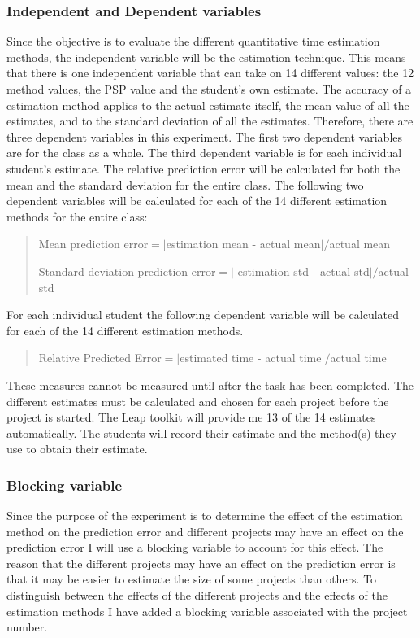 \subsubsection{Independent and Dependent variables}

Since the objective is to evaluate the different quantitative time estimation
methods, the independent variable will be the estimation technique.  This means
that there is one independent variable that can take on 14 different values:
the 12 method values, the PSP value and the student's own estimate.  The
accuracy of a estimation method applies to the actual estimate itself, the mean
value of all the estimates, and to the standard deviation of all the estimates.
Therefore, there are three dependent variables in this experiment.  The first
two dependent variables are for the class as a whole.  The third dependent
variable is for each individual student's estimate.  The relative prediction
error will be calculated for both the mean and the standard deviation for the
entire class.  The following two dependent variables will be calculated for
each of the 14 different estimation methods for the entire class:
\begin{quote}
Mean prediction error$ = | $estimation mean - actual mean$ | / $actual mean

Standard deviation prediction error$ = |$ estimation std - actual std$ | / $actual
std
\end{quote}

For each individual student the following dependent variable will be calculated
for each of the 14 different estimation methods.

\begin{quote}
Relative Predicted Error$ = | $estimated time - actual time$ | / $actual time
\end{quote}

These measures cannot be measured until after the task has been completed.  The
different estimates must be calculated and chosen for each project before the
project is started.  The Leap toolkit will provide me 13 of the 14 estimates
automatically. The students will record their estimate and the method(s) they use
to obtain their estimate.

\subsubsection{Blocking variable}

Since the purpose of the experiment is to determine the effect of the
estimation method on the prediction error and different projects may have an
effect on the prediction error I will use a blocking variable to account for
this effect.  The reason that the different projects may have an effect on the
prediction error is that it may be easier to estimate the size of some projects
than others.  To distinguish between the effects of the different projects and
the effects of the estimation methods I have added a blocking variable
associated with the project number.

